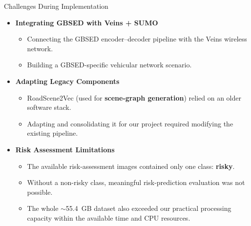 \documentclass[aspectratio=169]{beamer}
\begin{document}
\begin{frame}{Challenges During Implementation}

\small

\begin{itemize}

    \item \textbf{Integrating GBSED with Veins + SUMO}
    \begin{itemize}
        \item Connecting the GBSED encoder--decoder pipeline
        with the Veins wireless network.
        \item Building a GBSED-specific vehicular network scenario.
    \end{itemize}

    \vspace{0.08cm}

    \item \textbf{Adapting Legacy Components}
    \begin{itemize}
        \item RoadScene2Vec (used for \textbf{scene-graph generation})
        relied on an older software stack.
        \item Adapting and consolidating it for our project
        required modifying the existing pipeline.
    \end{itemize}

    \vspace{0.08cm}

    \item \textbf{Risk Assessment Limitations}
    \begin{itemize}
        \item The available risk-assessment images contained only
        one class: \textbf{risky}.
        \item Without a non-risky class, meaningful risk-prediction
        evaluation was not possible.
        \item The whole $\sim$55.4~GB dataset also exceeded our practical
        processing capacity within the available time and CPU resources.
    \end{itemize}

\end{itemize}

\end{frame}
\end{document}
